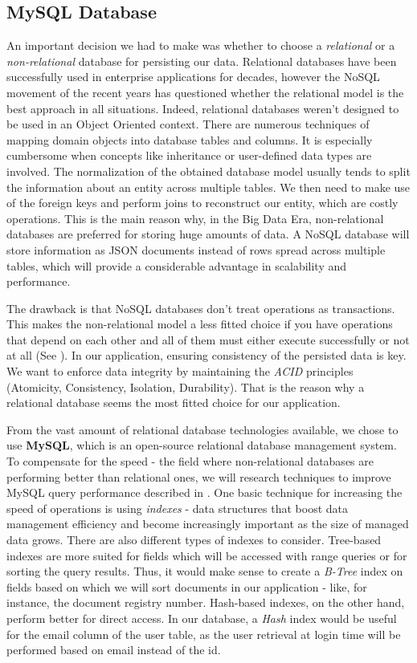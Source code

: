 \subsection{MySQL Database}
\label{section:mysqlDatabase}

An important decision we had to make was whether to choose a \textit{relational} or a \textit{non-relational} database for persisting our data. Relational databases have been successfully used in enterprise applications for decades, however the NoSQL movement of the recent years has questioned whether the relational model is the best approach in all situations. Indeed, relational databases weren't designed to be used in an Object Oriented context. There are numerous techniques of mapping domain objects into database tables and columns. It is especially cumbersome when concepts like inheritance or user-defined data types are involved. The normalization of the obtained database model usually tends to split the information about an entity across multiple tables. We then need to make use of the foreign keys and perform joins to reconstruct our entity, which are costly operations. This is the main reason why, in the Big Data Era, non-relational databases are preferred for storing huge amounts of data. A NoSQL database will store information as JSON documents instead of rows spread across multiple tables, which will provide a considerable advantage in scalability and performance.

The drawback is that NoSQL databases don't treat operations as transactions. This makes the non-relational model a less fitted choice if you have operations that depend on each other and all of them must either execute successfully or not at all (See \cite{conciseGuideToDatabases}). In our application, ensuring consistency of the persisted data is key. We want to enforce data integrity by maintaining the \textit{ACID} principles (Atomicity, Consistency, Isolation, Durability). That is the reason why a relational database seems the most fitted choice for our application.

From the vast amount of relational database technologies available, we chose to use \textbf{MySQL}, which is an open-source relational database management system. To compensate for the speed - the field where non-relational databases are performing better than relational ones, we will research techniques to improve MySQL query performance described in \cite{highPerformanceMySQL}. One basic technique for increasing the speed of operations is using \textit{indexes} - data structures that boost data management efficiency and become increasingly important as the size of managed data grows. There are also different types of indexes to consider. Tree-based indexes are more suited for fields which will be accessed with range queries or for sorting the query results. Thus, it would make sense to create a \textit{B-Tree} index on fields based on which we will sort documents in our application - like, for instance, the document registry number. Hash-based indexes, on the other hand, perform better for direct access. In our database, a \textit{Hash} index would be useful for the email column of the user table, as the user retrieval at login time will be performed based on email instead of the id.


